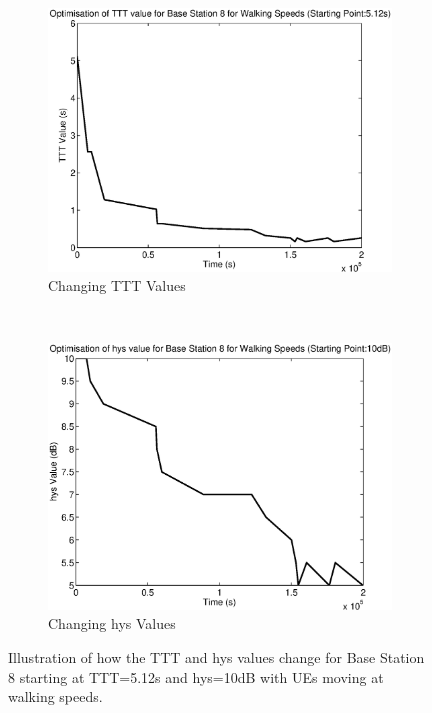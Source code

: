 \begin{figure}[H]
        \centering
        \begin{subfigure}[b]{0.49\textwidth}
                \includegraphics[width=\textwidth]{figures/graphs/walkhigh/TTT8.eps}
                \caption{Changing TTT Values}
        \end{subfigure}%
        ~ %
        \begin{subfigure}[b]{0.49\textwidth}
                \includegraphics[width=\textwidth]{figures/graphs/walkhigh/hys8.eps}
                \caption{Changing hys Values}
        \end{subfigure}
        \caption{Illustration of how the TTT and hys values change for Base Station 8 starting at TTT=5.12s and hys=10dB with UEs moving at walking speeds.}
\end{figure}
